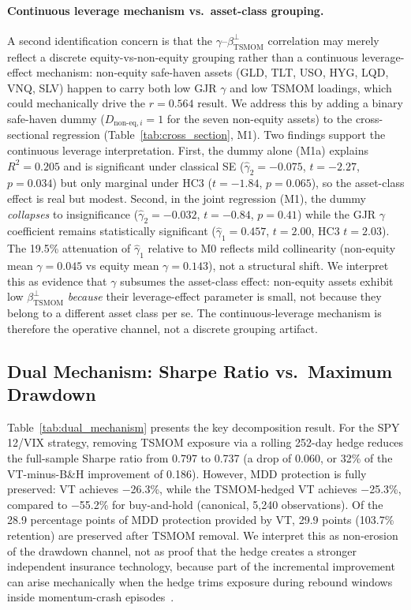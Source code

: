 \paragraph{Continuous leverage mechanism vs.\ asset-class grouping.} A second identification concern is that the $\gamma$--$\beta_{\text{TSMOM}}^{\perp}$ correlation may merely reflect a discrete equity-vs-non-equity grouping rather than a continuous leverage-effect mechanism: non-equity safe-haven assets (GLD, TLT, USO, HYG, LQD, VNQ, SLV) happen to carry both low GJR $\gamma$ and low TSMOM loadings, which could mechanically drive the $r = 0.564$ result. We address this by adding a binary safe-haven dummy ($D_{\text{non-eq},i} = 1$ for the seven non-equity assets) to the cross-sectional regression (Table~\ref{tab:cross_section}, M1). Two findings support the continuous leverage interpretation. First, the dummy alone (M1a) explains $R^2 = 0.205$ and is significant under classical SE ($\hat{\gamma}_2 = -0.075$, $t = -2.27$, $p = 0.034$) but only marginal under HC3 ($t = -1.84$, $p = 0.065$), so the asset-class effect is real but modest. Second, in the joint regression (M1), the dummy \textit{collapses} to insignificance ($\hat{\gamma}_2 = -0.032$, $t = -0.84$, $p = 0.41$) while the GJR $\gamma$ coefficient remains statistically significant ($\hat{\gamma}_1 = 0.457$, $t = 2.00$, HC3 $t = 2.03$). The 19.5\% attenuation of $\hat{\gamma}_1$ relative to M0 reflects mild collinearity (non-equity mean $\gamma = 0.045$ vs equity mean $\gamma = 0.143$), not a structural shift. We interpret this as evidence that $\gamma$ subsumes the asset-class effect: non-equity assets exhibit low $\beta_{\text{TSMOM}}^{\perp}$ \textit{because} their leverage-effect parameter is small, not because they belong to a different asset class per se. The continuous-leverage mechanism is therefore the operative channel, not a discrete grouping artifact.


\subsection{Dual Mechanism: Sharpe Ratio vs.\ Maximum Drawdown}

Table~\ref{tab:dual_mechanism} presents the key decomposition result. For the SPY 12/VIX strategy, removing TSMOM exposure via a rolling 252-day hedge reduces the full-sample Sharpe ratio from 0.797 to 0.737 (a drop of 0.060, or 32\% of the VT-minus-B\&H improvement of 0.186). However, MDD protection is fully preserved: VT achieves $-$26.3\%, while the TSMOM-hedged VT achieves $-$25.3\%, compared to $-$55.2\% for buy-and-hold (canonical, 5{,}240 observations). Of the 28.9 percentage points of MDD protection provided by VT, 29.9 points (103.7\% retention) are preserved after TSMOM removal. We interpret this as non-erosion of the drawdown channel, not as proof that the hedge creates a stronger independent insurance technology, because part of the incremental improvement can arise mechanically when the hedge trims exposure during rebound windows inside momentum-crash episodes~\citep{daniel2016}.

